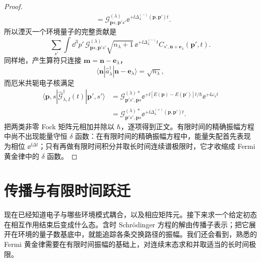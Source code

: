 \begin{proof}
\begin{align*}
 &=\mathcal G^{(\lambda)}_{\mathbf p s,\mathbf p's'}
 \ee^{+\ii\Delta_\lambda^{(-)}(\mathbf p,\mathbf p')t}.
\end{align*}
所以湮灭一个环境量子的完整贡献是
\begin{equation*}
 \sum_{s'}\int\dd^3p'\,
 \mathcal G^{(\lambda)}_{\mathbf p s,\mathbf p's'}
 \sqrt{n_\lambda+1}\,
 \ee^{+\ii\Delta_\lambda^{(-)}t}
 C_{s',\mathbf n+\mathbf e_\lambda}(\mathbf p',t).
\end{equation*}
同样地，产生算符只连接 $\mathbf m=\mathbf n-\mathbf e_\lambda$，
\begin{equation*}
 \langle\mathbf n|\hat a_\lambda^\dagger|
 \mathbf n-\mathbf e_\lambda\rangle=\sqrt{n_\lambda},
\end{equation*}
而厄米共轭电子核满足
\begin{align*}
 \langle\mathbf p,s|\hat{\mathcal G}_{\lambda,I}^\dagger(t)|\mathbf p',s'\rangle
 &=\mathcal G^{(\lambda)*}_{\mathbf p's',\mathbf p s}
 \ee^{+\ii[E(\mathbf p)-E(\mathbf p')]t/\hbar}
 \ee^{+\ii\omega_\lambda t}\\
 &=\mathcal G^{(\lambda)*}_{\mathbf p's',\mathbf p s}
 \ee^{+\ii\Delta_\lambda^{(+)}(\mathbf p,\mathbf p')t}.
\end{align*}
把两类非零 Fock 矩阵元相加并除以 $\hbar$，逐项得到正文。有限时间的精确振幅方程中尚不出现能量守恒 $\delta$ 函数：在有限时间的精确振幅方程中，能量失配首先表现为相位 $\ee^{\ii\Delta t}$；只有再做有限时间积分并取长时间连续谱极限时，它才收缩成 Fermi 黄金律中的 $\delta$ 函数。
\end{proof}


\section{传播与有限时间跃迁}

现在已经知道电子与哪些环境模式耦合，以及相应矩阵元。接下来求一个给定初态在相互作用结束后变成什么态。含时 Schr\"odinger 方程的解由传播子表示；把它展开在环境的量子数基底中，就能追踪各条交换路径的振幅。我们还会看到，熟悉的 Fermi 黄金律需要在有限时间振幅的基础上，对连续末态求和并取适当的长时间极限。

